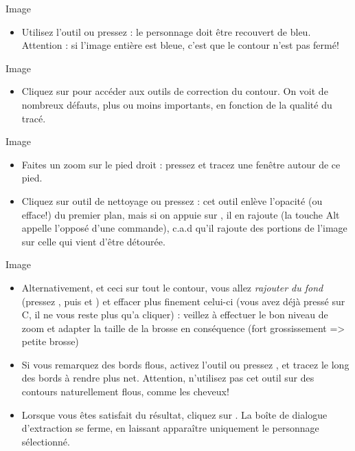 \documentclass[a4paper,12pt,french]{sphinxmanual}
\begin{document}
Image
\begin{itemize}
\item {} 
Utilisez l'outil  ou pressez  : le personnage doit être recouvert de bleu. Attention : si l'image entière est bleue, c'est que le contour n'est pas fermé!

\end{itemize}

Image
\begin{itemize}
\item {} 
Cliquez sur  pour accéder aux outils de correction du contour. On voit de nombreux défauts, plus ou moins importants, en fonction de la qualité du tracé.

\end{itemize}

Image
\begin{itemize}
\item {} 
Faites un zoom sur le pied droit : pressez  et tracez une fenêtre autour de ce pied.

\item {} 
Cliquez sur outil de nettoyage ou pressez  : cet outil enlève l'opacité (ou efface!) du premier plan, mais si on appuie sur , il en rajoute (la touche Alt appelle l'opposé d'une commande), c.a.d qu'il rajoute des portions de l'image sur celle qui vient d'être détourée.

\end{itemize}

Image
\begin{itemize}
\item {} 
Alternativement, et ceci sur tout le contour, vous allez \emph{rajouter du fond} (pressez , puis  et ) et effacer plus finement celui-ci (vous avez déjà pressé sur C, il ne vous reste plus qu'a cliquer) : veillez à effectuer le bon niveau de zoom et adapter la taille de la brosse en conséquence (fort grossissement =\textgreater{} petite brosse)

\item {} 
Si vous remarquez des bords flous, activez l'outil  ou pressez , et tracez le long des bords à rendre plus net. Attention, n'utilisez pas cet outil sur des contours naturellement flous, comme les cheveux!

\item {} 
Lorsque vous êtes satisfait du résultat, cliquez sur . La boîte de dialogue d'extraction se ferme, en laissant apparaître uniquement le personnage sélectionné.

\end{itemize}
\end{document}
